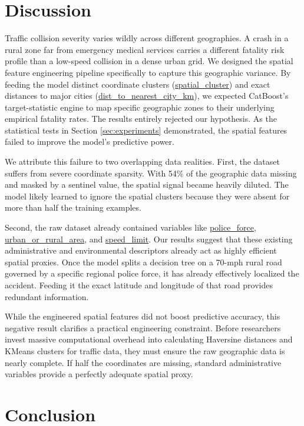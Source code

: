 \documentclass[runningheads]{llncs}
\begin{document}
\FloatBarrier
\section{Discussion}

Traffic collision severity varies wildly across different geographies. A crash in a rural zone far from emergency medical services carries a different fatality risk profile than a low-speed collision in a dense urban grid. We designed the spatial feature engineering pipeline specifically to capture this geographic variance. By feeding the model distinct coordinate clusters (\url{spatial_cluster}) and exact distances to major cities (\url{dist_to_nearest_city_km}), we expected CatBoost's target-statistic engine to map specific geographic zones to their underlying empirical fatality rates. The results entirely rejected our hypothesis. As the statistical tests in Section \ref{sec:experiments} demonstrated, the spatial features failed to improve the model's predictive power. 

We attribute this failure to two overlapping data realities. First, the dataset suffers from severe coordinate sparsity. With 54\% of the geographic data missing and masked by a sentinel value, the spatial signal became heavily diluted. The model likely learned to ignore the spatial clusters because they were absent for more than half the training examples. 

Second, the raw dataset already contained variables like \url{police_force}, \url{urban_or_rural_area}, and \url{speed_limit}. Our results suggest that these existing administrative and environmental descriptors already act as highly efficient spatial proxies. Once the model splits a decision tree on a 70-mph rural road governed by a specific regional police force, it has already effectively localized the accident. Feeding it the exact latitude and longitude of that road provides redundant information. 

While the engineered spatial features did not boost predictive accuracy, this negative result clarifies a practical engineering constraint. Before researchers invest massive computational overhead into calculating Haversine distances and KMeans clusters for traffic data, they must ensure the raw geographic data is nearly complete. If half the coordinates are missing, standard administrative variables provide a perfectly adequate spatial proxy.


\FloatBarrier
\section{Conclusion}
\end{document}
